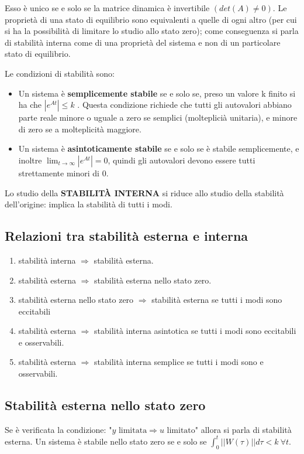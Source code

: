 \documentclass{article}
\begin{document}
Esso è unico se e solo se la matrice dinamica è invertibile  $(det(A)\neq 0)$.
Le proprietà di una stato di equilibrio sono equivalenti a quelle di ogni altro (per cui si ha la possibilità di limitare lo studio allo stato zero);
come conseguenza si parla di stabilità interna come di una proprietà del sistema e non di un particolare stato di equilibrio.

Le condizioni di stabilità sono:
\begin{itemize}
    \item Un sistema è \textbf{semplicemente stabile} se e solo se, preso un valore k finito si ha che ${|e^{At}|\leq k}$ .
    Questa condizione richiede che tutti gli autovalori abbiano
    parte reale minore o uguale a zero se semplici (molteplicià unitaria), e minore di zero se a molteplicità maggiore.
    \item Un sistema è \textbf{asintoticamente stabile} se e solo se è stabile semplicemente,
    e inoltre \(\displaystyle \lim_{t \to\infty }|e^{At}|=0 \), quindi gli autovalori devono essere tutti strettamente minori di 0.
\end{itemize}

Lo studio della \textbf{STABILITÀ INTERNA} si riduce allo studio della stabilità dell'origine: implica la stabilità di tutti i modi.


\subsection{Relazioni tra stabilità esterna e interna}
\begin{enumerate}
    \item stabilità interna $\Longrightarrow$ stabilità esterna.
    \item stabilità esterna $\Longrightarrow$ stabilità esterna nello stato zero.
    \item stabilità esterna nello stato zero $\Longrightarrow$ stabilità esterna se tutti i modi sono eccitabili
    \item stabilità esterna $\Longrightarrow$
    stabilità interna asintotica se tutti i modi sono eccitabili e osservabili.
    \item stabilità esterna $\Longrightarrow$ 
    stabilità interna semplice se tutti i modi sono e osservabili.
\end{enumerate}


\subsection{Stabilità esterna nello stato zero}
Se è verificata la condizione: "$y \text{ limitata} \Longrightarrow u \text{ limitato}$" allora si parla di stabilità esterna.
Un sistema è stabile nello stato zero se e solo se \(\displaystyle \int_{0}^{t}||W(\tau)||d\tau < k \ \forall t \).
\end{document}
